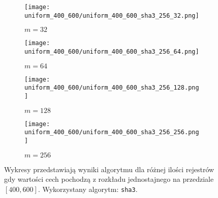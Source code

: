 \begin{figure}[H]
    \begin{subfigure}{0.5\textwidth}
        \texttt{[image: uniform\_400\_600/uniform\_400\_600\_sha3\_256\_32.png]}
        \caption{$m = 32$}
        \label{fig:subim1}
    \end{subfigure}
    \begin{subfigure}{0.5\textwidth}
        \texttt{[image: uniform\_400\_600/uniform\_400\_600\_sha3\_256\_64.png]}
        \caption{$m = 64$}
        \label{fig:subim1}
    \end{subfigure}
    \begin{subfigure}{0.5\textwidth}
        \texttt{[image: uniform\_400\_600/uniform\_400\_600\_sha3\_256\_128.png]}
        \caption{$m = 128$}
        \label{fig:subim2}
    \end{subfigure}
    \begin{subfigure}{0.5\textwidth}
        \texttt{[image: uniform\_400\_600/uniform\_400\_600\_sha3\_256\_256.png]}
        \caption{$m = 256$}
        \label{fig:subim2}
    \end{subfigure}

    \caption{Wykresy przedstawiają wyniki algorytmu dla różnej ilości rejestrów gdy wartości cech pochodzą z rozkładu jednostajnego na przedziale $[400, 600]$. Wykorzystany algorytm: \texttt{sha3}.}
    \label{fig:uniform_sha3_256}
\end{figure}
